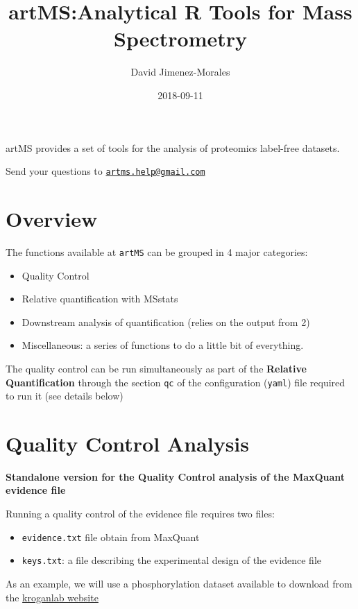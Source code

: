 \documentclass[]{article}
\title{artMS:Analytical R Tools for Mass Spectrometry}
\author{David Jimenez-Morales}
\date{2018-09-11}
\providecommand{\tightlist}{%
  \setlength{\itemsep}{0pt}\setlength{\parskip}{0pt}}
\begin{document}
\maketitle

{
\setcounter{tocdepth}{2}
\tableofcontents
}
artMS provides a set of tools for the analysis of proteomics label-free
datasets.

Send your questions to
\href{mailto:artms.help@gmail.com}{\nolinkurl{artms.help@gmail.com}}

\section{Overview}\label{overview}

The functions available at \texttt{artMS} can be grouped in 4 major
categories:

\begin{itemize}
\tightlist
\item
  Quality Control
\item
  Relative quantification with MSstats
\item
  Downstream analysis of quantification (relies on the output from 2)
\item
  Miscellaneous: a series of functions to do a little bit of everything.
\end{itemize}

The quality control can be run simultaneously as part of the
\textbf{Relative Quantification} through the section \texttt{qc} of the
configuration (\texttt{yaml}) file required to run it (see details
below)

\section{Quality Control Analysis}\label{quality-control-analysis}

\textbf{Standalone version for the Quality Control analysis of the
MaxQuant evidence file}

Running a quality control of the evidence file requires two files:

\begin{itemize}
\tightlist
\item
  \texttt{evidence.txt} file obtain from MaxQuant
\item
  \texttt{keys.txt}: a file describing the experimental design of the
  evidence file
\end{itemize}

As an example, we will use a phosphorylation dataset available to
download from the \href{http://kroganlab.ucsf.edu/}{kroganlab website}
\end{document}
